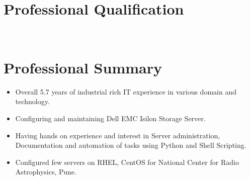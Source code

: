 \documentclass[11pt,a4paper,sans]{moderncv}        %
\begin{document}
\makecvtitle
\section{Professional Qualification}
~\\
\section{Professional Summary}
\begin{itemize} 
\item Overall 5.7 years of industrial rich IT experience in various domain and technology.
\item Configuring and maintaining Dell EMC Isilon Storage Server.
\item Having hands on experience and interest in Server administration, Documentation and automation of tasks using Python and Shell Scripting.
\item Configured few servers on RHEL, CentOS for National Center for Radio Astrophysics, Pune.
\end{itemize}
~\\
\end{document}
